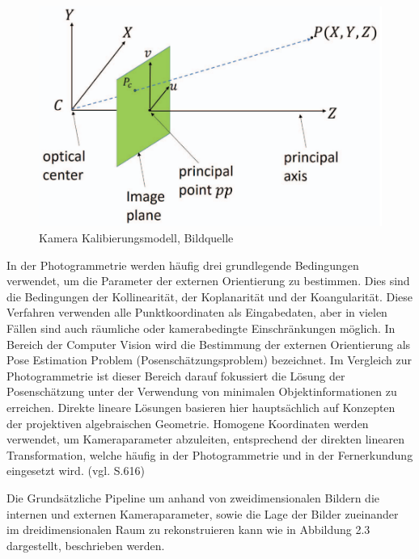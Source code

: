 \begin{figure}[H]
	\centering
	\includegraphics[scale=0.6]{pp.png}
	\caption{Kamera Kalibierungsmodell, Bildquelle \cite{pp}}
\end{figure} 

In der Photogrammetrie werden häufig drei grundlegende Bedingungen verwendet, um die Parameter der externen Orientierung zu bestimmen. Dies sind die Bedingungen der Kollinearität, der Koplanarität und der Koangularität. Diese Verfahren verwenden alle Punktkoordinaten als Eingabedaten, aber in vielen Fällen sind auch räumliche oder kamerabedingte Einschränkungen möglich. In Bereich der Computer Vision wird die Bestimmung der externen Orientierung als \glqq Pose Estimation Problem\grqq{} (Posenschätzungsproblem) bezeichnet. Im Vergleich zur Photogrammetrie ist dieser Bereich darauf fokussiert die Lösung der Posenschätzung unter der Verwendung von minimalen Objektinformationen zu erreichen. Direkte lineare Lösungen basieren hier hauptsächlich auf Konzepten der projektiven algebraischen Geometrie. Homogene Koordinaten werden verwendet, um Kameraparameter abzuleiten, entsprechend der direkten linearen Transformation, welche häufig in der Photogrammetrie und in der Fernerkundung eingesetzt wird. (vgl. \cite{exterior_review} S.616)

Die Grundsätzliche Pipeline um anhand von zweidimensionalen Bildern die internen und externen Kameraparameter, sowie die Lage der Bilder zueinander im dreidimensionalen Raum zu rekonstruieren kann wie in Abbildung 2.3 dargestellt, beschrieben werden.

